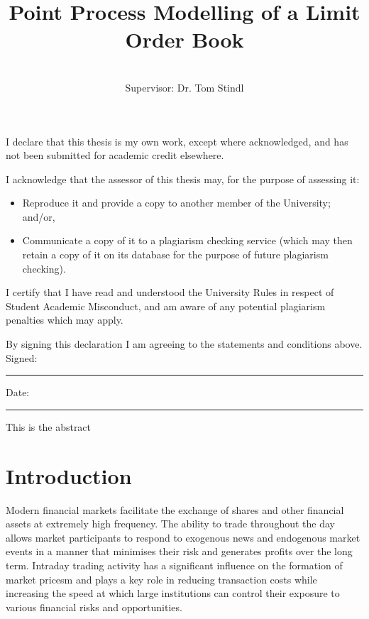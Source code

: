 \documentclass[honours,12pt]{unswthesis}
\title{Point Process Modelling of a Limit Order Book}
\author{\Authornameonly\\{\bigskip}Supervisor: Dr. Tom Stindl}
\newcommand\blankpage{%
    \null
    \thispagestyle{empty}%
    \addtocounter{page}{-1}%
    \newpage}
\numberwithin{equation}{section}
\begin{document}
\beforepreface

\afterpage{\blankpage}



\vskip 10pc \noindent I declare that this thesis is my
own work, except where acknowledged, and has not been submitted for
academic credit elsewhere. 

\vskip 2pc  \noindent I acknowledge that the assessor of this
thesis may, for the purpose of assessing it:
\begin{itemize}
\item Reproduce it and provide a copy to another member of the University; and/or,
\item Communicate a copy of it to a plagiarism checking service (which may then retain a copy of it on its database for the purpose of future plagiarism checking).
\end{itemize}

\vskip 2pc \noindent I certify that I have read and understood the University Rules in
respect of Student Academic Misconduct, and am aware of any potential plagiarism penalties which may 
apply.\vspace{24pt}

\vskip 2pc \noindent By signing 
this declaration I am
agreeing to the statements and conditions above.
\vskip 2pc \noindent
Signed: \rule{7cm}{0.25pt} \hfill Date: \rule{4cm}{0.25pt} \newline
\vskip 1pc

\afterpage{\blankpage}




\afterpage{\blankpage}



This is the abstract
\afterpage{\blankpage}


\afterpreface

\afterpage{\blankpage}

\chapter{Introduction}\label{s-intro}

{\noindent}Modern financial markets facilitate the exchange of shares and other financial assets at extremely high frequency. The ability to trade throughout the day allows market participants to respond to exogenous news and endogenous market events in a manner that minimises their risk and generates profits over the long term. Intraday trading activity has a significant influence on the formation of market pricesm and plays a key role in reducing transaction costs while increasing the speed at which large institutions can control their exposure to various financial risks and opportunities.
\end{document}
